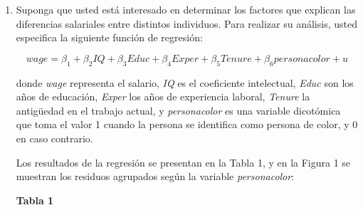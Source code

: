 \documentclass[10pt,a4paper]{article}
\begin{document}
\begin{enumerate}
\begin{enumerate}

    \item (5 puntos) ¿El coeficiente estimado mediante variable instrumental será mayor o menor que el estimado por MCO?\\


\end{enumerate}

\item Suponga que usted está interesado en determinar los factores que explican
las diferencias salariales entre distintos individuos. Para realizar
su análisis, usted especifica la siguiente función de regresión:

\begin{equation}
wage = \beta_{1} + \beta_{2}IQ + \beta_{3}Educ + \beta_{4}Exper + \beta_{5}Tenure + \beta_{6}personacolor + u \label{eq:original}
\end{equation}

donde \emph{wage} representa el salario, \emph{IQ} es el coeficiente intelectual,
\emph{Educ} son los años de educación, \emph{Exper} los años de experiencia laboral,
\emph{Tenure} la antigüedad en el trabajo actual, y \emph{personacolor} es una variable dicotómica
que toma el valor 1 cuando la persona se identifica como {persona de color}, y 0 en caso contrario.


Los resultados de la regresión se presentan en la Tabla 1, y en la Figura 1 se muestran los residuos
agrupados según la variable \emph{personacolor}:

\begin{center}
\textbf{Tabla 1}
\end{center}


\end{enumerate}
\end{document}

